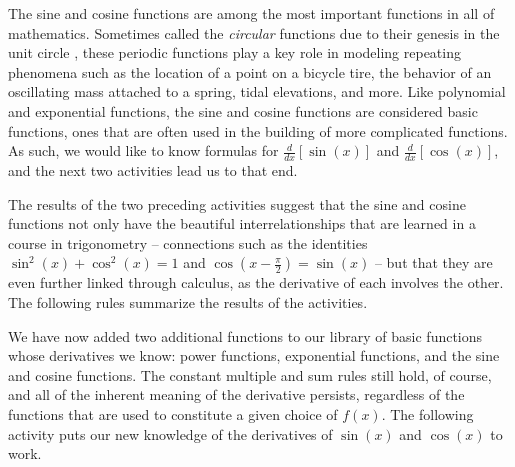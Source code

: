 The sine and cosine functions are among the most important functions in all of mathematics.  Sometimes called the \emph{circular} functions due to their genesis in the unit circle%
, these periodic functions play a key role in modeling repeating phenomena such as the location of a point on a bicycle tire, the behavior of an oscillating mass attached to a spring, tidal elevations, and more.  Like polynomial and exponential functions, the sine and cosine functions are considered basic functions, ones that are often used in the building of more complicated functions.  As such, we would like to know formulas for $\frac{d}{dx} [\sin(x)]$ and $\frac{d}{dx} [\cos(x)]$, and the next two activities lead us to that end.



The results of the two preceding activities suggest that the sine and cosine functions not only have the beautiful interrelationships that are learned in a course in trigonometry -- connections such as the identities $\sin^2(x) + \cos^2(x) = 1$ and $\cos(x - \frac{\pi}{2}) = \sin(x)$ -- but that they are even further linked through calculus, as the derivative of each involves the other.  The following rules summarize the results of the activities. 




We have now added two additional functions to our library of basic functions whose derivatives we know: power functions, exponential functions, and the sine and cosine functions.  The constant multiple and sum rules still hold, of course, and all of the inherent meaning of the derivative persists, regardless of the functions that are used to constitute a given choice of $f(x)$.  The following activity puts our new knowledge of the derivatives of $\sin(x)$ and $\cos(x)$ to work.


